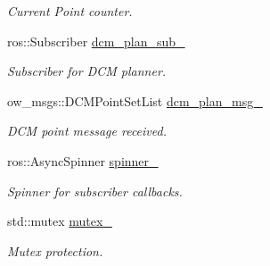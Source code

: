 \begin{DoxyCompactItemize}
\begin{DoxyCompactList}\small\item\em Current Point counter. \end{DoxyCompactList}\item 
ros\+::\+Subscriber \hyperlink{classow__com__tg_1_1COMTrajectoryGenerator_a6d36f32f2bf06b4fbdba63be46c32d69}{dcm\+\_\+plan\+\_\+sub\+\_\+}\hypertarget{classow__com__tg_1_1COMTrajectoryGenerator_a6d36f32f2bf06b4fbdba63be46c32d69}{}\label{classow__com__tg_1_1COMTrajectoryGenerator_a6d36f32f2bf06b4fbdba63be46c32d69}

\begin{DoxyCompactList}\small\item\em Subscriber for D\+CM planner. \end{DoxyCompactList}\item 
ow\+\_\+msgs\+::\+D\+C\+M\+Point\+Set\+List \hyperlink{classow__com__tg_1_1COMTrajectoryGenerator_afd5bed44f65f675f84a530006004400c}{dcm\+\_\+plan\+\_\+msg\+\_\+}\hypertarget{classow__com__tg_1_1COMTrajectoryGenerator_afd5bed44f65f675f84a530006004400c}{}\label{classow__com__tg_1_1COMTrajectoryGenerator_afd5bed44f65f675f84a530006004400c}

\begin{DoxyCompactList}\small\item\em D\+CM point message received. \end{DoxyCompactList}\item 
ros\+::\+Async\+Spinner \hyperlink{classow__com__tg_1_1COMTrajectoryGenerator_addc8791533a84c00756422df0297f1cd}{spinner\+\_\+}\hypertarget{classow__com__tg_1_1COMTrajectoryGenerator_addc8791533a84c00756422df0297f1cd}{}\label{classow__com__tg_1_1COMTrajectoryGenerator_addc8791533a84c00756422df0297f1cd}

\begin{DoxyCompactList}\small\item\em Spinner for subscriber callbacks. \end{DoxyCompactList}\item 
std\+::mutex \hyperlink{classow__com__tg_1_1COMTrajectoryGenerator_a176401cf956def2343b7da04dc0bb9e4}{mutex\+\_\+}\hypertarget{classow__com__tg_1_1COMTrajectoryGenerator_a176401cf956def2343b7da04dc0bb9e4}{}\label{classow__com__tg_1_1COMTrajectoryGenerator_a176401cf956def2343b7da04dc0bb9e4}

\begin{DoxyCompactList}\small\item\em Mutex protection. \end{DoxyCompactList}\end{DoxyCompactItemize}



